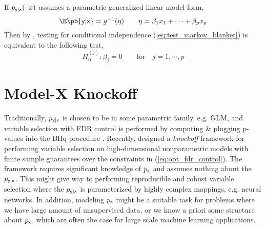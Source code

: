 \documentclass[11pt]{article}
\begin{document}
If $p_{\mathsf{y}|\mathsf{x}}(\cdot|x)$ assumes a parametric generalized linear model form, 
\[
    \E\pb{\ry|\rx} = g^{-1}(\eta)
    \quad\quad
    \eta = \beta_1 x_1 + \cdots + \beta_p x_p    
\]
Then by \cite{candesPanningGoldModelX2017}, testing for conditional independence (\ref{eq:test_markov_blanket}) is equivalent to the following test,
\[
    H_0^{(j)}:
        \beta_j = 0
    \quad\quad\text{for}\quad
        j = 1,\cdots,p
    \label{test_glm}
\]

\section{Model-X Knockoff}

Traditionally, $p_{\mathsf{y}|\mathsf{x}}$ is chosen to be in some parametric family, e.g. GLM, and variable selection with FDR control is performed by computing \& plugging p-values into the BHq procedure \cite{benjaminiControllingFalseDiscovery1995}. Recently, \cite{barberControllingFalseDiscovery2015,candesPanningGoldModelX2017} designed a \textit{knockoff} framework for performing variable selection on high-dimensional nonparametric models with finite sample guarantees over the constraints in (\ref{eq:opt_fdr_control}). The framework requires significant knowledge of $p_{\mathsf{x}}$ and assumes nothing about the $p_{\mathsf{y}|\mathsf{x}}$. This might give way to performing reproducible and robust variable selection where the $p_{\mathsf{y}|\mathsf{x}}$ is parameterized by highly complex mappings, e.g. neural networks. In addition, modeling $p_{\mathsf{x}}$ might be a suitable task for problems where we have large amount of unsupervised data, or we know a priori some structure about $p_{\mathsf{x}}$, which are often the case for large scale machine learning applications.





\newpage
\printbibliography 
\end{document}
